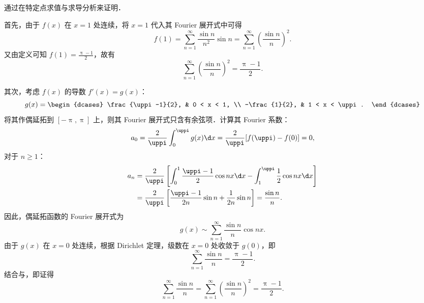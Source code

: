 \begin{myproof}
    通过在特定点求值与求导分析来证明．

    首先，由于 $f(x)$ 在 $x=1$ 处连续，将 $x=1$ 代入其 Fourier 展开式中可得
    \begin{equation}\label{eq:f1-value}
        f(1) = \sum_{n=1}^{\infty} \frac{\sin n}{n^2} \sin n = \sum_{n=1}^{\infty} \left( \frac{\sin n}{n} \right)^2.
    \end{equation}
    又由定义可知 $f(1) = \frac{\uppi-1}{2}$，故有
    \begin{equation}\label{eq:part1-1}
        \sum_{n=1}^{\infty} \left( \frac{\sin n}{n} \right)^2 = \frac{\uppi-1}{2}.
    \end{equation}

    其次，考虑 $f(x)$ 的导数 $f'(x) = g(x)$：
    \begin{equation}\label{eq:g-def}
        g(x) = \begin{dcases} \frac{\uppi-1}{2}, & 0 < x < 1, \\ -\frac{1}{2}, & 1 < x < \uppi. \end{dcases}
    \end{equation}
    将其作偶延拓到 $[-\uppi, \uppi]$ 上，则其 Fourier 展开式只含有余弦项．计算其 Fourier 系数：
    \begin{equation}\label{eq:g-a0}
        a_0 = \frac{2}{\uppi} \int_{0}^{\uppi} g(x) \d x = \frac{2}{\uppi} [f(\uppi) - f(0)] = 0,
    \end{equation}
    对于 $n \geqslant 1$：
    \begin{equation}\label{eq:g-an}
        \begin{aligned}
            a_n & = \frac{2}{\uppi} \left[ \int_{0}^{1} \frac{\uppi-1}{2} \cos nx \d x - \int_{1}^{\uppi} \frac{1}{2} \cos nx \d x \right] \\
                & = \frac{2}{\uppi} \left[ \frac{\uppi-1}{2n} \sin n + \frac{1}{2n} \sin n \right] = \frac{\sin n}{n}.
        \end{aligned}
    \end{equation}
    因此，偶延拓函数的 Fourier 展开式为
    \begin{equation}\label{eq:g-fourier}
        g(x) \sim \sum_{n=1}^{\infty} \frac{\sin n}{n} \cos nx.
    \end{equation}
    由于 $g(x)$ 在 $x=0$ 处连续，根据 Dirichlet 定理，级数在 $x=0$ 处收敛于 $g(0)$，即
    \begin{equation}\label{eq:g0-value}
        \sum_{n=1}^{\infty} \frac{\sin n}{n} = \frac{\uppi-1}{2}.
    \end{equation}
    结合与，即证得
    \begin{equation}
        \sum_{n=1}^{\infty} \frac{\sin n}{n} = \sum_{n=1}^{\infty} \left(\frac{\sin n}{n}\right)^2 = \frac{\uppi-1}{2}.
    \end{equation}


\end{myproof}
